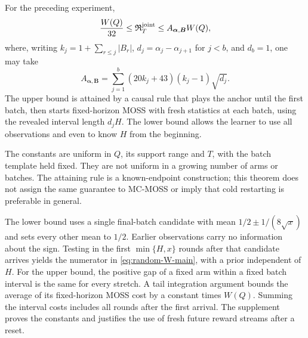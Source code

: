\begin{theorem}\label{thm:random-positive-main}
For the preceding experiment,
\begin{equation}\label{eq:random-template-main}
 \frac{W(Q)}{32}\le\mathfrak R_T^{\mathrm{joint}}
 \le A_{\boldsymbol\alpha,\boldsymbol B}W(Q),
\end{equation}
where, writing $k_j=1+\sum_{r\le j}|B_r|$,
$d_j=\alpha_j-\alpha_{j+1}$ for $j<b$, and $d_b=1$, one may take
\[
 A_{\boldsymbol\alpha,\boldsymbol B}
   =\sum_{j=1}^b(20k_j+43)(k_j-1)\sqrt{d_j}.
\]
The upper bound is attained by a causal rule that plays the anchor
until the first batch, then starts fixed-horizon MOSS with fresh
statistics at each batch, using the revealed interval length $d_jH$.
The lower bound allows the learner to use all observations and even
to know $H$ from the beginning.
\end{theorem}

The constants are uniform in $Q$, its support range and $T$, with the
batch template held fixed. They are not uniform in a growing number
of arms or batches. The attaining rule is a known-endpoint
construction; this theorem does not assign the same guarantee to
MC-MOSS or imply that cold restarting is preferable in general.

The lower bound uses a single final-batch candidate with mean
$1/2\pm1/(8\sqrt x)$ and sets every other mean to $1/2$. Earlier
observations carry no information about the sign. Testing in the
first $\min\{H,x\}$ rounds after that candidate arrives yields the
numerator in \eqref{eq:random-W-main}, with a prior independent of $H$.
For the upper bound, the positive gap of a fixed arm within a fixed
batch interval is the same for every stretch. A tail integration
argument bounds the average of its fixed-horizon MOSS cost by a
constant times $W(Q)$. Summing the interval costs includes all rounds
after the first arrival. The supplement proves the constants and
justifies the use of fresh future reward streams after a reset.

